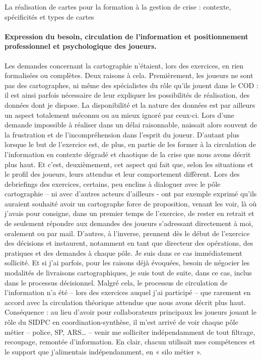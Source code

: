 \documentclass[10pt,a4paper]{report} %
\begin{document}
\begin{part}{La réalisation de cartes pour la formation à la gestion de crise : contexte, spécificités et types de cartes}
\paragraph{Expression du besoin, circulation de l’information et positionnement professionnel et psychologique des joueurs.}
Les demandes concernant la cartographie n’étaient, lors des exercices, en rien formalisées ou complètes. Deux raisons à cela. Premièrement, les joueurs ne sont pas des cartographes, ni même des spécialistes du rôle qu’ils jouent dans le COD : il est ainsi parfois nécessaire de leur expliquer les possibilités de réalisation, des données dont je dispose. La disponibilité et la nature des données est par ailleurs un aspect totalement méconnu ou au mieux ignoré par ceux-ci. Lors d’une demande impossible à réaliser dans un délai raisonnable, naissait alors souvent de la frustration et de l’incompréhension dans l’esprit du joueur. D’autant plus lorsque le but de l’exercice est, de plus, en partie de les former à la circulation de l’information en contexte dégradé et chaotique de la crise que nous avons décrit plus haut. Et c’est, deuxièmement, cet aspect qui fait que, selon les situations et le profil des joueurs, leurs attendus et leur comportement diffèrent. Lors des debriefings des exercices, certains, peu enclins à dialoguer avec le pôle cartographie – ni avec d’autres acteurs d’ailleurs - ont par exemple exprimé qu’ils auraient souhaité avoir un cartographe force de proposition, venant les voir, là où j’avais pour consigne, dans un premier temps de l’exercice, de rester en retrait et de seulement répondre aux demandes des joueurs s’adressant directement à moi, oralement ou par mail. D’autres, à l’inverse, prennent dès le début de l’exercice des décisions et instaurent, notamment en tant que directeur des opérations, des pratiques et des demandes à chaque pôle. Je suis dans ce cas immédiatement sollicité. Et si j’ai parfois, pour les raisons déjà évoquées, besoin de négocier les modalités de livraisons cartographiques, je suis tout de suite, dans ce cas, inclus dans le processus décisionnel. Malgré cela, le processus de circulation de l’information n’a été – lors des exercices auquel j’ai participé – que rarement en accord avec la circulation théorique attendue que nous avons décrit plus haut. Conséquence : au lieu d’avoir pour collaborateurs principaux les joueurs jouant le rôle du SIDPC en coordination-synthèse, il m’est arrivé de voir chaque pôle métier – police, SP, ARS… – venir me solliciter indépendamment de tout filtrage, recoupage, remontée d’information. En clair, chacun utilisait mes compétences et le support que j’alimentais indépendamment, en « silo métier ». 


\end{part}
\end{document}

